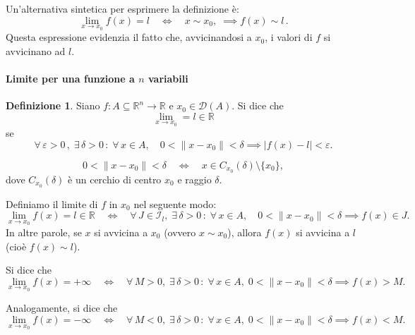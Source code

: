 \documentclass{article}
\theoremstyle{plain}
\theoremstyle{definition}
\newtheorem{defn}{Definizione}[section]
\theoremstyle{remark}
\begin{document}
Un'alternativa sintetica per esprimere la definizione è:
\[
\lim_{x\to x_0} f(x)=l \quad \iff \quad x\sim x_0,\;\implies f(x)\sim l\,.
\]
Questa espressione evidenzia il fatto che, avvicinandosi a \(x_0\), i valori di \(f\) si avvicinano ad \(l\).

\vspace{10pt}

\paragraph{Limite per una funzione a $n$ variabili}
\begin{bxthm}
\begin{defn}
    Siano $f:A\subseteq\mathbb{R}^n\to\mathbb{R}$ e $x_0\in\mathcal{D}(A)$. 
    Si dice che 
    \[\lim_{x\to x_0}=l\in\mathbb{R}\]
    se 
    \[\forall\, \varepsilon>0\,,\; \exists\, \delta>0\,:\;\forall\, x\in A,\quad 0<\| x-x_0 \|<\delta\implies | f(x)-l |<\varepsilon.\]
\end{defn}
\end{bxthm}

\vspace{10pt}


\[
0 < \|x - x_0\| < \delta \quad \iff \quad x \in C_{x_0}(\delta) \setminus \{x_0\},
\]
dove \(C_{x_0}(\delta)\) è un cerchio di centro \(x_0\) e raggio \(\delta\).

Definiamo il limite di \(f\) in \(x_0\) nel seguente modo:
\[
\lim_{x\to x_0} f(x) = l \in \mathbb{R} \quad \iff \quad \forall\, J\in\mathcal{I}_l,\; \exists\, \delta > 0\,:\; \forall\, x \in A,\quad 0 < \|x - x_0\| < \delta\implies f(x) \in J.
\]
In altre parole, se \(x\) si avvicina a \(x_0\) (ovvero \(x \sim x_0\)), allora \(f(x)\) si avvicina a \(l\) (cioè \(f(x) \sim l\)).

Si dice che
\[
\lim_{x\to x_0} f(x) = +\infty \quad \iff \quad \forall\, M > 0,\; \exists\, \delta > 0\,:\;\forall\, x \in A,\; 0 < \|x - x_0\| < \delta\implies f(x) > M.
\]

Analogamente, si dice che
\[
\lim_{x\to x_0} f(x) = -\infty \quad \iff \quad \forall\, M < 0,\; \exists\, \delta > 0 \,:\; \forall\, x \in A,\; 0 < \|x - x_0\| < \delta\implies f(x) < M.
\]

\vspace{10pt}
\end{document}
